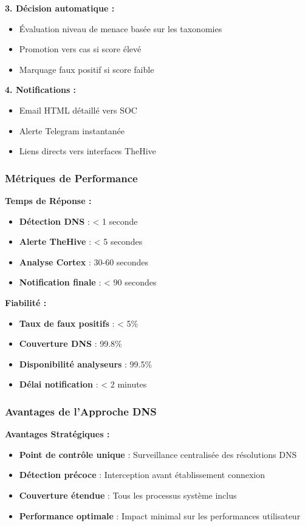 \textbf{3. Décision automatique :}
\begin{itemize}
    \item Évaluation niveau de menace basée sur les taxonomies
    \item Promotion vers cas si score élevé
    \item Marquage faux positif si score faible
\end{itemize}

\textbf{4. Notifications :}
\begin{itemize}
    \item Email HTML détaillé vers SOC
    \item Alerte Telegram instantanée
    \item Liens directs vers interfaces TheHive
\end{itemize}

\subsubsection{Métriques de Performance}

\textbf{Temps de Réponse :}
\begin{itemize}
    \item \textbf{Détection DNS} : < 1 seconde
    \item \textbf{Alerte TheHive} : < 5 secondes
    \item \textbf{Analyse Cortex} : 30-60 secondes
    \item \textbf{Notification finale} : < 90 secondes
\end{itemize}

\textbf{Fiabilité :}
\begin{itemize}
    \item \textbf{Taux de faux positifs} : < 5\%
    \item \textbf{Couverture DNS} : 99.8\%
    \item \textbf{Disponibilité analyseurs} : 99.5\%
    \item \textbf{Délai notification} : < 2 minutes
\end{itemize}

\subsubsection{Avantages de l'Approche DNS}

\textbf{Avantages Stratégiques :}
\begin{itemize}
    \item \textbf{Point de contrôle unique} : Surveillance centralisée des résolutions DNS
    \item \textbf{Détection précoce} : Interception avant établissement connexion
    \item \textbf{Couverture étendue} : Tous les processus système inclus
    \item \textbf{Performance optimale} : Impact minimal sur les performances utilisateur
\end{itemize}

